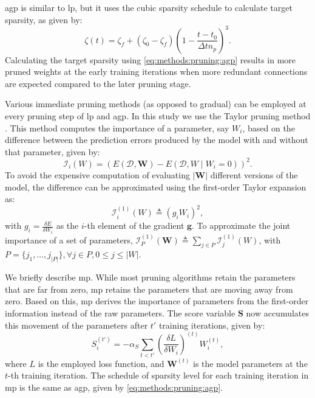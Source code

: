 \documentclass[mathematics,article,submit,pdftex,moreauthors]{Definitions/mdpi}
\renewcommand{\vec}[1]{\bm{#1}}
\begin{document}
\ac{agp} is similar to \ac{lp}, but it uses the cubic sparsity
schedule to calculate target sparsity, as given by:
\begin{equation}
    \zeta(t) = \zeta_f + (\zeta_0-\zeta_f)(1-\frac{t-t_0}{\Delta t n_p})^3.
\label{eq:methods:pruning:agp}
\end{equation}
Calculating the target sparsity using \eqref{eq:methods:pruning:agp}
results in more pruned weights at the early training iterations
when more redundant connections are expected
compared to the later pruning stage. 

Various immediate pruning methods (as opposed to gradual)
can be employed at every pruning step of \ac{lp}
and \ac{agp}. In this study we use the Taylor
pruning method \cite{Molchanov2019}. This method
computes the importance of a parameter, say $W_i$,
based on the difference between the prediction errors
produced by the model with and without that parameter,
given by:
\begin{equation}
    \mathcal{I}_{i}(W) = \left( E(\mathcal{D}, \vec{W}) - E(\mathcal{D}, W \mid W_i=0) \right)^2.
\end{equation}
To avoid the expensive computation of evaluating 
$|\vec{W}|$ different versions of the model,
the difference can be approximated using the first-order
Taylor expansion as:
\begin{equation}
    \mathcal{I}^{(1)}_{i}(W) \triangleq \left( g_i W_i \right)^2,
\end{equation}
with $g_i = \frac{\delta E}{\delta W_i}$ as the $i$-th
element of the gradient $\vec{g}$. To approximate
the joint importance of a set of parameters,
$\mathcal{I}^{(1)}_P(\vec{W}) \triangleq \sum_{j \in P} 
\mathcal{I}^{(1)}_{j}(W)$, with $P = \{j_1,\ldots, j_{|P|}\},
\forall j \in P, 0\leq j\leq |W|$.

We briefly describe \ac{mp}. 
While most pruning algorithms retain the parameters
that are far from zero, \ac{mp} retains the parameters
that are moving away from zero. Based on this,
\ac{mp} derives
the importance of parameters from the first-order
information instead of the raw parameters.
The score variable $\vec{S}$ now accumulates this movement
of the parameters after $t'$ training iterations, given by:
\begin{equation}
    S^{(t')}_i = - \alpha_S \sum_{t<t'} \left(\frac{\delta L}{\delta W_i}\right)^{(t)} W^{(t)}_i,
\end{equation}
where $L$ is the employed loss function, and $\vec{W}^{(t)}$ is the
model parameters at the $t$-th training iteration. The schedule
of sparsity level for each training iteration in \ac{mp}
is the same as \ac{agp}, given by \eqref{eq:methods:pruning:agp}.
\end{document}
